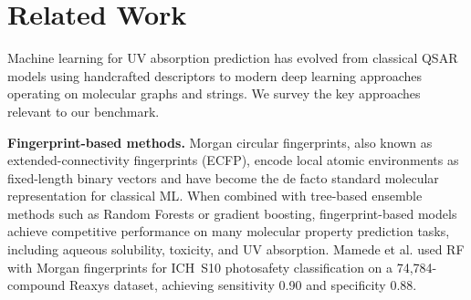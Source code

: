\FloatBarrier
\section{Related Work}
\label{sec:related_work}

Machine learning for UV absorption prediction has evolved from classical QSAR models using handcrafted descriptors to modern deep learning approaches operating on molecular graphs and strings.
We survey the key approaches relevant to our benchmark.

\textbf{Fingerprint-based methods.}
Morgan circular fingerprints\cite{rogers2010extended}, also known as extended-connectivity fingerprints (ECFP), encode local atomic environments as fixed-length binary vectors and have become the de facto standard molecular representation for classical ML\cite{wuMoleculeNet2018}.
When combined with tree-based ensemble methods such as Random Forests\cite{breiman2001random} or gradient boosting\cite{chen2016xgboost}, fingerprint-based models achieve competitive performance on many molecular property prediction tasks, including aqueous solubility\cite{delaney2004esol, panapitiya2022evaluation}, toxicity\cite{mayr2016deeptox}, and UV absorption\cite{mamede2021machine}.
Mamede et al.\cite{mamede2021machine} used RF with Morgan fingerprints for ICH~S10\cite{ICH2013S10} photosafety classification on a 74,784-compound Reaxys dataset, achieving sensitivity 0.90 and specificity 0.88.

